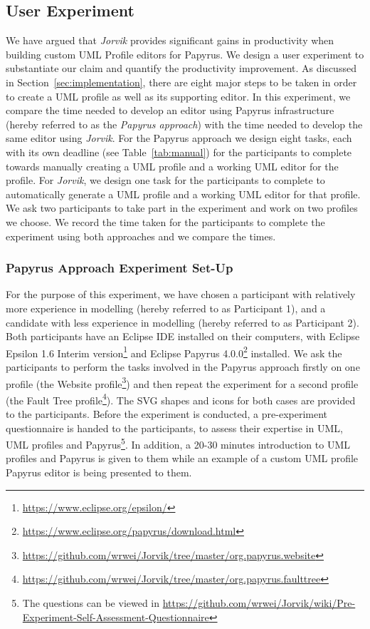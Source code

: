 \subsection{User Experiment}
We have argued that \textit{Jorvik} provides significant gains in productivity when building custom UML Profile editors for Papyrus.
We design a user experiment to substantiate our claim and quantify the productivity improvement. 
As discussed in Section~\ref{sec:implementation}, there are eight major steps to be taken in order to create a UML profile as well as its supporting editor. 
In this experiment, we compare the time needed to develop an editor using Papyrus infrastructure (hereby referred to as the \textit{Papyrus approach}) with the time needed to develop the same editor using \textit{Jorvik}.
For the Papyrus approach we design eight tasks, each with its own deadline (see Table~\ref{tab:manual}) for the participants to complete towards manually creating a UML profile and a working UML editor for the profile.
For \textit{Jorvik}, we design one task for the participants to complete to automatically generate a UML profile and a working UML editor for that profile.
We ask two participants to take part in the experiment and work on two profiles we choose. 
We record the time taken for the participants to complete the experiment using both approaches and we compare the times.

\subsubsection{Papyrus Approach Experiment Set-Up}
For the purpose of this experiment, we have chosen a participant with relatively more experience in modelling (hereby referred to as Participant 1), and a candidate with less experience in modelling (hereby referred to as Participant 2). 
Both participants have an Eclipse IDE installed on their computers, with Eclipse Epsilon 1.6 Interim version\footnote{\url{https://www.eclipse.org/epsilon/}} and Eclipse Papyrus 4.0.0\footnote{\url{https://www.eclipse.org/papyrus/download.html}} installed.
We ask the participants to perform the tasks involved in the Papyrus approach firstly on one profile (the Website profile\footnote{\url{https://github.com/wrwei/Jorvik/tree/master/org.papyrus.website}}) and then repeat the experiment for a second profile (the Fault Tree profile\footnote{\url{https://github.com/wrwei/Jorvik/tree/master/org.papyrus.faulttree}}). %
The SVG shapes and icons for both cases are provided to the participants. 
Before the experiment is conducted, a pre-experiment questionnaire is handed to the participants, to assess their expertise in UML, UML profiles and Papyrus\footnote{The questions can be viewed in \url{https://github.com/wrwei/Jorvik/wiki/Pre-Experiment-Self-Assessment-Questionnaire}}. 
In addition, a 20-30 minutes introduction to UML profiles and Papyrus is given to them while an example of a custom UML profile Papyrus editor is being presented to them. 

